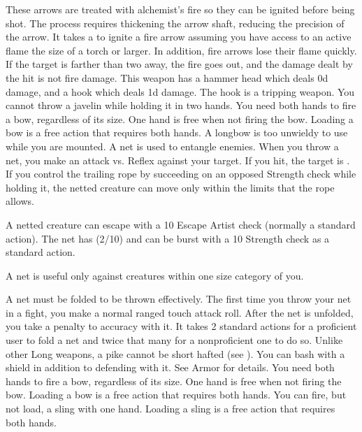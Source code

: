          These arrows are treated with alchemist's fire so they can be ignited before being shot.
        The process requires thickening the arrow shaft, reducing the precision of the arrow.
        It takes a  to ignite a fire arrow assuming you have access to an active flame the size of a torch or larger.
        In addition, fire arrows lose their flame quickly.
        If the target is farther than two  away, the fire goes out, and the damage dealt by the hit is not fire damage.
         This weapon has a hammer head which deals \plus0d damage, and a hook which deals \minus1d damage. The hook is a tripping weapon.
         You cannot throw a javelin while holding it in two hands.
         You need both hands to fire a bow, regardless of its size. One hand is free when not firing the bow. Loading a bow is a free action that requires both hands. A longbow is too unwieldy to use while you are mounted.
         A net is used to entangle enemies. When you throw a net, you make an attack vs. Reflex against your target. If you hit, the target is \slowed. If you control the trailing rope by succeeding on an opposed Strength check while holding it, the netted creature can move only within the limits that the rope allows.
        \par A netted creature can escape with a  10 Escape Artist check (normally a standard action). The net has (2/10) and can be burst with a  10 Strength check as a standard action.
        \par A net is useful only against creatures within one size category of you.
        \par A net must be folded to be thrown effectively. The first time you throw your net in a fight, you make a normal ranged touch attack roll. After the net is unfolded, you take a  penalty to accuracy with it. It takes 2 standard actions for a proficient user to fold a net and twice that many for a nonproficient one to do so.
         Unlike other Long weapons, a pike cannot be short hafted (see ).
         You can bash with a shield in addition to defending with it. See Armor for details.
         You need both hands to fire a bow, regardless of its size. One hand is free when not firing the bow. Loading a bow is a free action that requires both hands.
         You can fire, but not load, a sling with one hand. Loading a sling is a free action that requires both hands.
